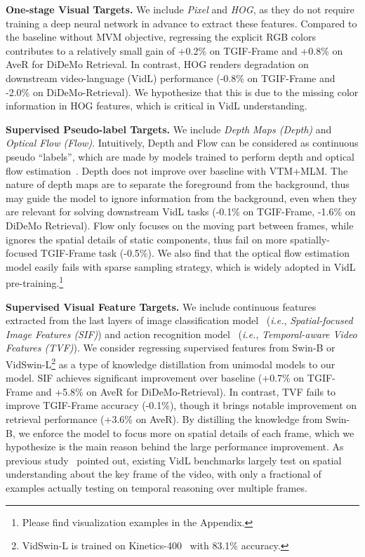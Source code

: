 \documentclass[10pt,twocolumn,letterpaper]{article}
\begin{document}
\vspace{0.5ex}
\noindent \textbf{One-stage Visual Targets.} We include \textit{Pixel} and \textit{HOG}, as they do not require training a deep neural network in advance to extract these features. Compared to the baseline without MVM objective, regressing the explicit RGB colors contributes to a relatively small gain of +0.2\% on TGIF-Frame and +0.8\% on AveR for DiDeMo Retrieval. In contrast, HOG renders degradation on downstream video-language (VidL) performance (-0.8\% on TGIF-Frame and -2.0\% on DiDeMo-Retrieval). We hypothesize that this is due to the missing color information in HOG features, which is critical in VidL understanding. 

\vspace{0.5ex}
\noindent \textbf{Supervised Pseudo-label Targets.} We include \textit{Depth Maps (Depth)} and \textit{Optical Flow (Flow)}. Intuitively, Depth and Flow can be considered as continuous pseudo ``labels'', which are made by models trained to perform depth and optical flow estimation~\cite{ranftl2021dpt, teed2020raft}. Depth does not improve over baseline with VTM+MLM. The nature of depth maps are to separate the foreground from the background, thus may guide the model to ignore information from the background, even when they are relevant for solving downstream VidL tasks (-0.1\% on TGIF-Frame, -1.6\% on DiDeMo Retrieval). Flow only focuses on the moving part between frames, while ignores the spatial details of static components, thus fail on more spatially-focused TGIF-Frame task (-0.5\%). We also find that the optical flow estimation model easily fails with sparse sampling strategy, which is widely adopted in VidL pre-training.\footnote{Please find visualization examples in the Appendix.}

\vspace{0.5ex}
\noindent \textbf{Supervised Visual Feature Targets.} We include continuous features extracted from the last layers of image classification model~\cite{liu2021swin} (\emph{i.e.}, \textit{Spatial-focused Image Features (SIF)}) and action recognition model~\cite{liu2022video-swin} (\emph{i.e.}, \textit{Temporal-aware Video Features (TVF)}). We consider regressing supervised features from Swin-B or VidSwin-L\footnote{VidSwin-L is trained on Kinetics-400~\cite{kay2017kinetics} with 83.1\% accuracy.} as a type of knowledge distillation from unimodal models to our model. SIF achieves significant improvement over baseline (+0.7\% on TGIF-Frame and +5.8\% on AveR for DiDeMo-Retrieval). In contrast, TVF fails to improve TGIF-Frame accuracy (-0.1\%), though it brings notable improvement on retrieval performance (+3.6\% on AveR). By distilling the knowledge from Swin-B, we enforce the model to focus more on spatial details of each frame, which we hypothesize is the main reason behind the large performance improvement. As previous study~\cite{buch2022revisiting} pointed out, existing VidL benchmarks largely test on spatial understanding about the key frame of the video, with only a fractional of examples actually testing on temporal reasoning over multiple frames. 
\end{document}
